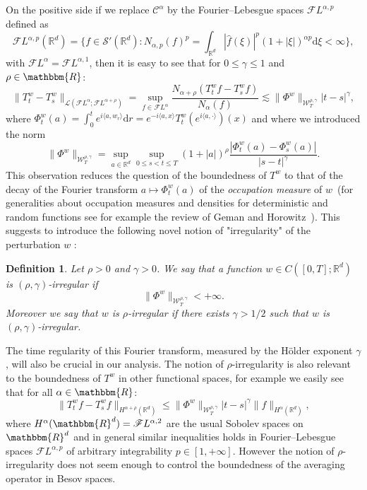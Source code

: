 \documentclass[a4paper,11pt]{article}
\newcommand{\mathd}{\mathrm{d}}
\newcommand{\tmem}[1]{{\em #1\/}}
\newtheorem{definition}[theorem]{Definition}
\newcommand{\CC}{\mathscr C}
\newcommand{\CF}{\mathscr F}
\newcommand{\RR}{\mathbb R}
\begin{document}
On the positive side if we replace $\CC^{\alpha}$ by the Fourier--Lebesgue
spaces $\mathcal{F}L^{\alpha ,p}$ defined as
\[ \mathcal{F}L^{\alpha ,p} ( \RR^{d} ) = \{f \in \mathcal{S}' ( \RR^{d}
   ):N_{\alpha ,p} (f)^{p} = \int_{\RR^{d}} | \hat{f} ( \xi )|^{p} (1+| \xi
   |)^{\alpha p} \mathd \xi < \infty\}, \]
with $\mathcal{F}L^{\alpha} =\mathcal{F}L^{\alpha ,1}$, then it is easy to
see that for $0 \leqslant \gamma \leqslant 1$ and $\rho \in \mathbbm{R}$:
\[ \| T^{w}_{t} -T^{w}_{s} \|_{\mathcal{L}(\mathcal{F}L^{\alpha} ;
   \mathcal{F}L^{\alpha + \rho})} = \sup_{f \in \mathcal{F}L^{\alpha}}
   \frac{N_{\alpha + \rho} ( T^{w}_{t} f-T^{w}_{s} f )}{N_{\alpha} ( f )}
   \lesssim \| \Phi^{w} \|_{\mathcal{W}^{\rho , \gamma}_{T}} | t-s |^{\gamma},
\]
where $\Phi^{w}_{t} (a) = \int_{0}^{t} e^{i \langle a,w_{r} \rangle} \mathd
r=e^{-i \langle a,x \rangle} T^{w}_{t} (e^{i \langle a, \cdot \rangle} ) ( x
)$ and where we introduced the norm
\[ \| \Phi^{w} \|_{\mathcal{W}^{\rho , \gamma}_{T}} = \sup_{a \in \RR^{d}}  
   \sup_{0 \leqslant s<t \leqslant T} (1+ |a|)^{\rho} \frac{|
   \Phi^{w}_{t} (a)- \Phi^{w}_{s} (a) |}{|s-t|^{\gamma}} . \]
This observation reduces the question of the boundedness of $T^{w}$ to that of
the decay of the Fourier transform $a \mapsto \Phi^{w}_{t} (a)$ of the
{\tmem{occupation measure}} of $w$~(for generalities about occupation measures
and densities for deterministic and random functions see for example the
review of Geman and Horowitz~{\cite{geman_occupation_1980}}). This suggests to
introduce the following novel notion of "irregularity" of the perturbation $w$
:

\begin{definition}
  \label{def:irregularity}Let $\rho >0$ and $\gamma >0$. We say that a
  function $w \in C ([0,T]; \RR^{d} )$ is $( \rho , \gamma )$-irregular if
  \[ \| \Phi^{w} \|_{\mathcal{W}^{\rho , \gamma}_{T}} <+ \infty . \]
  Moreover we say that $w$ is $\rho$-irregular if there exists $\gamma >1/2$
  such that $w$ is $( \rho , \gamma )$-irregular.
\end{definition}

The time regularity of this Fourier transform, measured by the Hölder
exponent $\gamma$, will also be crucial in our analysis. The notion of
$\rho$-irregularity is also relevant to the boundedness of $T^{w}$ in other
functional spaces, for example we easily see that for all $\alpha \in
\mathbbm{R}$:
\[ \|T^{w}_{t} f-T^{w}_{s} f\|_{H^{\alpha + \rho} ( \RR^{d} )} \leqslant \|
   \Phi^{w} \|_{\mathcal{W}^{\rho , \gamma}_{T}} |t-s|^{\gamma}
   \|f\|_{H^{\alpha} ( \RR^{d} )}, \]
where $H^{\alpha} ( \mathbbm{R}^{d} ) = \CF L^{\alpha ,2}$ are the usual
Sobolev spaces on $\mathbbm{R}^{d}$ and in general similar inequalities holds
in Fourier--Lebesgue spaces $\CF L^{\alpha ,p}$ of arbitrary integrability $p
\in [ 1,+ \infty ]$. However the notion of $\rho$-irregularity does not seem enough
 to control the boundedness of the averaging operator in Besov spaces.
\end{document}
